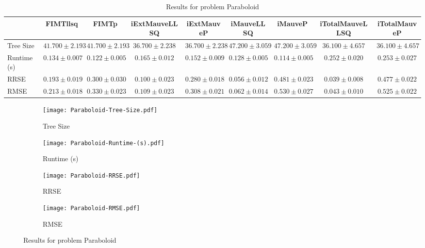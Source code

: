 \documentclass{article}
\begin{document}
\begin{table}[h]
\tiny
\begin{tabular}{|l|c|c|c|c|c|c|c|c|}
\hline
 & FIMTllsq & FIMTp & iExtMauveLLSQ & iExtMauveP & iMauveLLSQ & iMauveP & iTotalMauveLLSQ & iTotalMauveP\\
\hline
Tree Size & $41.700 \pm 2.193$ & $41.700 \pm 2.193$ & $36.700 \pm 2.238$ & $36.700 \pm 2.238$ & $47.200 \pm 3.059$ & $47.200 \pm 3.059$ & \cellcolor{blue!25} $36.100 \pm 4.657$ & \cellcolor{blue!25} $36.100 \pm 4.657$ \\
\hline
Runtime (s) & $0.134 \pm 0.007$ & $0.122 \pm 0.005$ & $0.165 \pm 0.012$ & $0.152 \pm 0.009$ & $0.128 \pm 0.005$ & \cellcolor{blue!25} $0.114 \pm 0.005$ & $0.252 \pm 0.020$ & $0.253 \pm 0.027$ \\
\hline
RRSE & $0.193 \pm 0.019$ & $0.300 \pm 0.030$ & $0.100 \pm 0.023$ & $0.280 \pm 0.018$ & $0.056 \pm 0.012$ & $0.481 \pm 0.023$ & \cellcolor{blue!25} $0.039 \pm 0.008$ & $0.477 \pm 0.022$ \\
\hline
RMSE & $0.213 \pm 0.018$ & $0.330 \pm 0.023$ & $0.109 \pm 0.023$ & $0.308 \pm 0.021$ & $0.062 \pm 0.014$ & $0.530 \pm 0.027$ & \cellcolor{blue!25} $0.043 \pm 0.010$ & $0.525 \pm 0.022$ \\
\hline
\end{tabular}
\caption{Results for problem Paraboloid}
\end{table}
\begin{figure}[h]
\centering
\begin{subfigure}{0.45\textwidth}
  \texttt{[image: Paraboloid-Tree-Size.pdf]}
  \caption{Tree Size}
\end{subfigure}
\begin{subfigure}{0.45\textwidth}
  \texttt{[image: Paraboloid-Runtime-(s).pdf]}
  \caption{Runtime (s)}
\end{subfigure}
\begin{subfigure}{0.45\textwidth}
  \texttt{[image: Paraboloid-RRSE.pdf]}
  \caption{RRSE}
\end{subfigure}
\begin{subfigure}{0.45\textwidth}
  \texttt{[image: Paraboloid-RMSE.pdf]}
  \caption{RMSE}
\end{subfigure}
\caption{Results for problem Paraboloid}
\end{figure}
\end{document}
